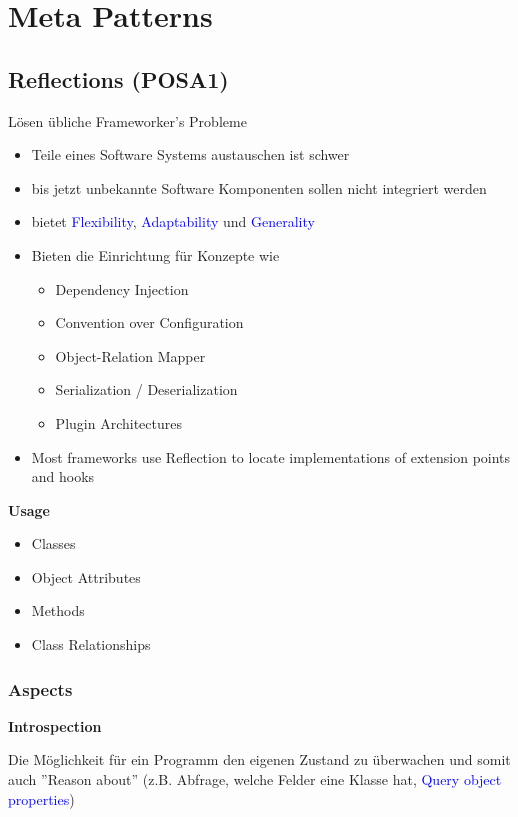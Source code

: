 \section{Meta Patterns}

\subsection{Reflections (POSA1)}

Lösen übliche Frameworker's Probleme

\begin{itemize}
    \item Teile eines Software Systems austauschen ist schwer
    \item bis jetzt unbekannte Software Komponenten sollen nicht integriert werden
    \item bietet \textcolor{blue}{Flexibility}, \textcolor{blue}{Adaptability} und \textcolor{blue}{Generality}
    \item Bieten die Einrichtung für Konzepte wie
    \begin{itemize}
        \item Dependency Injection
        \item Convention over Configuration
        \item Object-Relation Mapper
        \item Serialization / Deserialization
        \item Plugin Architectures
    \end{itemize}
    \item Most frameworks use Reflection to locate implementations of extension points and hooks
\end{itemize}

\textbf{Usage}
\begin{itemize}
    \item Classes
    \item Object Attributes
    \item Methods
    \item Class Relationships
\end{itemize}

\subsubsection{Aspects}

\textbf{Introspection}

Die Möglichkeit für ein Programm den eigenen Zustand zu überwachen und somit auch ''Reason about'' (z.B. Abfrage, welche Felder eine Klasse hat, \textcolor{blue}{Query object properties}) \\

